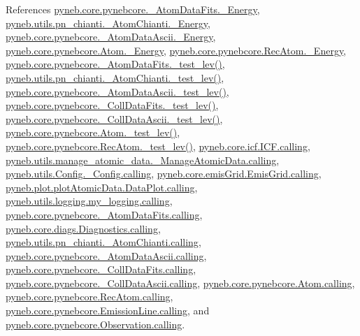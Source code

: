 References \hyperlink{pynebcore_8py_source_l00094}{pyneb.\+core.\+pynebcore.\+\_\+\+Atom\+Data\+Fits.\+\_\+\+Energy}, \hyperlink{pn__chianti_8py_source_l00264}{pyneb.\+utils.\+pn\+\_\+chianti.\+\_\+\+Atom\+Chianti.\+\_\+\+Energy}, \hyperlink{pynebcore_8py_source_l00400}{pyneb.\+core.\+pynebcore.\+\_\+\+Atom\+Data\+Ascii.\+\_\+\+Energy}, \hyperlink{pynebcore_8py_source_l01257}{pyneb.\+core.\+pynebcore.\+Atom.\+\_\+\+Energy}, \hyperlink{pynebcore_8py_source_l02586}{pyneb.\+core.\+pynebcore.\+Rec\+Atom.\+\_\+\+Energy}, \hyperlink{pynebcore_8py_source_l00171}{pyneb.\+core.\+pynebcore.\+\_\+\+Atom\+Data\+Fits.\+\_\+test\+\_\+lev()}, \hyperlink{pn__chianti_8py_source_l00284}{pyneb.\+utils.\+pn\+\_\+chianti.\+\_\+\+Atom\+Chianti.\+\_\+test\+\_\+lev()}, \hyperlink{pynebcore_8py_source_l00435}{pyneb.\+core.\+pynebcore.\+\_\+\+Atom\+Data\+Ascii.\+\_\+test\+\_\+lev()}, \hyperlink{pynebcore_8py_source_l00660}{pyneb.\+core.\+pynebcore.\+\_\+\+Coll\+Data\+Fits.\+\_\+test\+\_\+lev()}, \hyperlink{pynebcore_8py_source_l01026}{pyneb.\+core.\+pynebcore.\+\_\+\+Coll\+Data\+Ascii.\+\_\+test\+\_\+lev()}, \hyperlink{pynebcore_8py_source_l01459}{pyneb.\+core.\+pynebcore.\+Atom.\+\_\+test\+\_\+lev()}, \hyperlink{pynebcore_8py_source_l02596}{pyneb.\+core.\+pynebcore.\+Rec\+Atom.\+\_\+test\+\_\+lev()}, \hyperlink{icf_8py_source_l00016}{pyneb.\+core.\+icf.\+I\+C\+F.\+calling}, \hyperlink{manage__atomic__data_8py_source_l00018}{pyneb.\+utils.\+manage\+\_\+atomic\+\_\+data.\+\_\+\+Manage\+Atomic\+Data.\+calling}, \hyperlink{_config_8py_source_l00032}{pyneb.\+utils.\+Config.\+\_\+\+Config.\+calling}, \hyperlink{emis_grid_8py_source_l00041}{pyneb.\+core.\+emis\+Grid.\+Emis\+Grid.\+calling}, \hyperlink{plot_atomic_data_8py_source_l00042}{pyneb.\+plot.\+plot\+Atomic\+Data.\+Data\+Plot.\+calling}, \hyperlink{logging_8py_source_l00044}{pyneb.\+utils.\+logging.\+my\+\_\+logging.\+calling}, \hyperlink{pynebcore_8py_source_l00090}{pyneb.\+core.\+pynebcore.\+\_\+\+Atom\+Data\+Fits.\+calling}, \hyperlink{diags_8py_source_l00169}{pyneb.\+core.\+diags.\+Diagnostics.\+calling}, \hyperlink{pn__chianti_8py_source_l00223}{pyneb.\+utils.\+pn\+\_\+chianti.\+\_\+\+Atom\+Chianti.\+calling}, \hyperlink{pynebcore_8py_source_l00311}{pyneb.\+core.\+pynebcore.\+\_\+\+Atom\+Data\+Ascii.\+calling}, \hyperlink{pynebcore_8py_source_l00568}{pyneb.\+core.\+pynebcore.\+\_\+\+Coll\+Data\+Fits.\+calling}, \hyperlink{pynebcore_8py_source_l00918}{pyneb.\+core.\+pynebcore.\+\_\+\+Coll\+Data\+Ascii.\+calling}, \hyperlink{pynebcore_8py_source_l01175}{pyneb.\+core.\+pynebcore.\+Atom.\+calling}, \hyperlink{pynebcore_8py_source_l02572}{pyneb.\+core.\+pynebcore.\+Rec\+Atom.\+calling}, \hyperlink{pynebcore_8py_source_l03263}{pyneb.\+core.\+pynebcore.\+Emission\+Line.\+calling}, and \hyperlink{pynebcore_8py_source_l03419}{pyneb.\+core.\+pynebcore.\+Observation.\+calling}.


